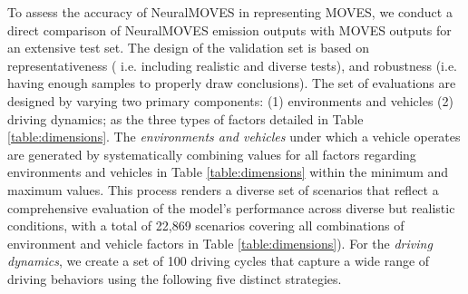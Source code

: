 \documentclass[12pt,english]{article}
\begin{document}
To assess the accuracy of NeuralMOVES in representing MOVES, we conduct a direct comparison of NeuralMOVES emission outputs with MOVES outputs for an extensive test set.
The design of the validation set is based on representativeness ( i.e. including realistic and diverse tests), and robustness (i.e. having enough samples to properly draw conclusions). 
The set of evaluations are designed by varying two primary components: (1) environments and vehicles (2) driving dynamics; as the three types of factors detailed in Table \ref{table:dimensions}. 
The \textit{environments and vehicles} under which a vehicle operates are generated by systematically combining values for all factors regarding environments and vehicles in Table \ref{table:dimensions} within the minimum and maximum values.
This process renders a diverse set of scenarios that reflect a comprehensive evaluation of the model’s performance across diverse but realistic conditions, with a total of 22,869 scenarios covering all combinations of environment and vehicle factors in Table \ref{table:dimensions}).
For the \textit{driving dynamics}, we create a set of 100 driving cycles that capture a wide range of driving behaviors using the following five distinct strategies.
\end{document}
